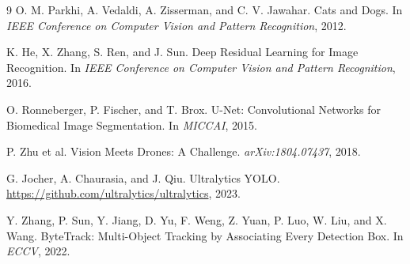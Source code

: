 \documentclass[10pt,twocolumn]{article}
\begin{document}
\begin{thebibliography}{9}
O. M. Parkhi, A. Vedaldi, A. Zisserman, and C. V. Jawahar. Cats and Dogs. In \emph{IEEE Conference on Computer Vision and Pattern Recognition}, 2012.

K. He, X. Zhang, S. Ren, and J. Sun. Deep Residual Learning for Image Recognition. In \emph{IEEE Conference on Computer Vision and Pattern Recognition}, 2016.

O. Ronneberger, P. Fischer, and T. Brox. U-Net: Convolutional Networks for Biomedical Image Segmentation. In \emph{MICCAI}, 2015.

P. Zhu et al. Vision Meets Drones: A Challenge. \emph{arXiv:1804.07437}, 2018.

G. Jocher, A. Chaurasia, and J. Qiu. Ultralytics YOLO. \url{https://github.com/ultralytics/ultralytics}, 2023.

Y. Zhang, P. Sun, Y. Jiang, D. Yu, F. Weng, Z. Yuan, P. Luo, W. Liu, and X. Wang. ByteTrack: Multi-Object Tracking by Associating Every Detection Box. In \emph{ECCV}, 2022.
\end{thebibliography}
\end{document}
